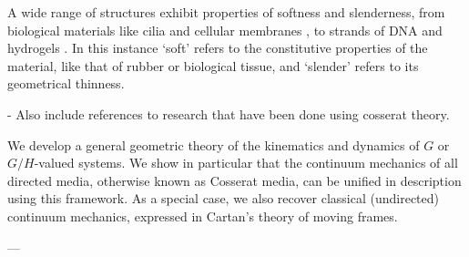 \documentclass[]{cam-thesis}
\begin{document}
A wide range of structures exhibit properties of softness and slenderness, from biological materials like cilia \citep{guMagneticCiliaCarpets2020} and cellular membranes \citep{krishnaswamyCosserattypeModelRed1996}, to strands of DNA \citep{corazzaUnravelingLoopingEfficiency2022} and hydrogels \citep{rajanMechanicsViscoelasticBuckling2019}. In this instance `soft' refers to the constitutive properties of the material, like that of rubber or biological tissue, and `slender' refers to its geometrical thinness.

- Also include references to research that have been done using cosserat theory.


We develop a general geometric theory of the kinematics and dynamics of $G$ or $G/H$-valued systems. We show in particular that the continuum mechanics of all directed media, otherwise known as Cosserat media, can be unified in description using this framework. As a special case, we also recover classical (undirected) continuum mechanics, expressed in Cartan's theory of moving frames.

---
\end{document}
